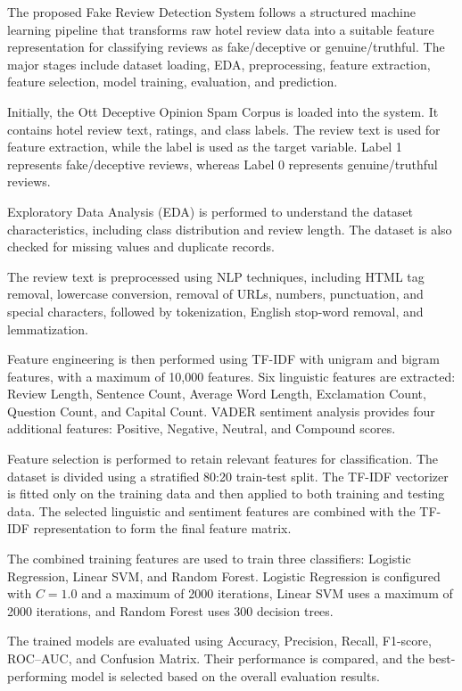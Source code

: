 \documentclass[12pt,a4paper]{report}
\begin{document}
The proposed Fake Review Detection System follows a structured machine learning pipeline that transforms raw hotel review data into a suitable feature representation for classifying reviews as fake/deceptive or genuine/truthful. The major stages include dataset loading, EDA, preprocessing, feature extraction, feature selection, model training, evaluation, and prediction.

Initially, the Ott Deceptive Opinion Spam Corpus is loaded into the system. It contains hotel review text, ratings, and class labels. The review text is used for feature extraction, while the label is used as the target variable. Label 1 represents fake/deceptive reviews, whereas Label 0 represents genuine/truthful reviews.

Exploratory Data Analysis (EDA) is performed to understand the dataset characteristics, including class distribution and review length. The dataset is also checked for missing values and duplicate records.

The review text is preprocessed using NLP techniques, including HTML tag removal, lowercase conversion, removal of URLs, numbers, punctuation, and special characters, followed by tokenization, English stop-word removal, and lemmatization.

Feature engineering is then performed using TF-IDF with unigram and bigram features, with a maximum of 10,000 features. Six linguistic features are extracted: Review Length, Sentence Count, Average Word Length, Exclamation Count, Question Count, and Capital Count. VADER sentiment analysis provides four additional features: Positive, Negative, Neutral, and Compound scores.

Feature selection is performed to retain relevant features for classification. The dataset is divided using a stratified 80:20 train-test split. The TF-IDF vectorizer is fitted only on the training data and then applied to both training and testing data. The selected linguistic and sentiment features are combined with the TF-IDF representation to form the final feature matrix.

The combined training features are used to train three classifiers: Logistic Regression, Linear SVM, and Random Forest. Logistic Regression is configured with $C=1.0$ and a maximum of 2000 iterations, Linear SVM uses a maximum of 2000 iterations, and Random Forest uses 300 decision trees.

The trained models are evaluated using Accuracy, Precision, Recall, F1-score, ROC--AUC, and Confusion Matrix. Their performance is compared, and the best-performing model is selected based on the overall evaluation results.
\end{document}
